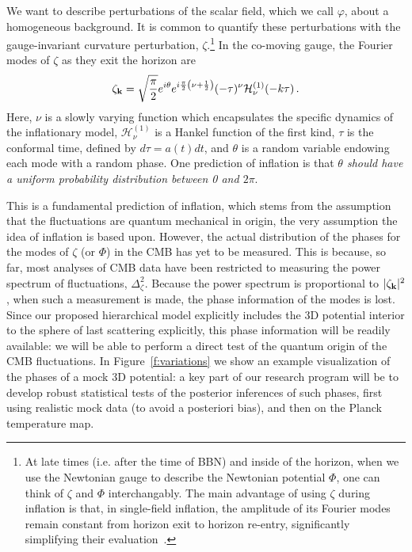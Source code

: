 \documentclass[psfig,12pt]{article}
\def\be{\begin{equation}}
\def\ee{\end{equation}}
\begin{document}
{We want to describe perturbations of the scalar field, which we call
$\varphi$, about a homogeneous background. It is common to quantify
these perturbations with the gauge-invariant curvature perturbation,
$\zeta$.\footnote{At late times (i.e. after the time of BBN) and inside
of the horizon, when we use the Newtonian gauge to describe the
Newtonian potential $\Phi$, one can think of $\zeta$ and $\Phi$
interchangably. The main advantage of using $\zeta$ during inflation is
that, in single-field inflation, the amplitude of its Fourier modes
remain constant from horizon exit to horizon re-entry, significantly
simplifying their evaluation~\cite{Weinberg2008}.}
In the co-moving gauge, the Fourier modes of $\zeta$ as they exit the
horizon are
\be
	\zeta_{{\bf k}}=\sqrt{\frac{\pi}{2}}e^{i\theta}e^{i\frac{\pi}{2}\left(\nu+\frac{1}{2}\right)}(-\tau)^{\nu}\mathcal{H}^{(1)}_\nu(-k\tau)\, .
\ee
Here, $\nu$ is a slowly varying function which encapsulates the specific
dynamics of the inflationary model, $\mathcal{H}^{(1)}_\nu$ is a Hankel
function of the first kind, $\tau$ is the conformal time, defined by
$d\tau=a(t)dt$, and $\theta$ is a random variable endowing each mode
with a random phase. One prediction of inflation is that {\it $\theta$ should
have a uniform probability distribution between 0 and $2\pi$}.

This is a
fundamental prediction of inflation, which stems from the assumption that
the fluctuations are quantum mechanical in origin, the very assumption
the idea of inflation is based upon.
However, the actual distribution of the phases for the modes of $\zeta$
(or $\Phi$) in the CMB has yet to be measured. This is because, so far,
most analyses of CMB data have been restricted to measuring
the power spectrum of
fluctuations, $\Delta_\zeta^2$.
Because the power spectrum is proportional to $ |\zeta_{{\bf k}}|^2$,
when such a measurement is made, the phase information of the modes is
lost.
Since our proposed hierarchical model explicitly
includes the 3D potential interior to the sphere of last scattering
explicitly,
this phase information will
be readily available:
we will be able to perform a direct test of the quantum
origin of the CMB fluctuations. In Figure~\ref{f:variations} we
show an example visualization of the phases of a mock 3D potential:
a key part of our research program will be to develop
robust statistical
tests of the posterior inferences of such phases, first using realistic
mock data (to avoid {a posteriori} bias),
and then on the Planck temperature map.

}
\end{document}
